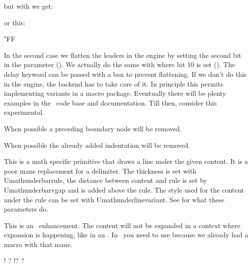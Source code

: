 but with  we get:

\startlinecorrection
\normalizeparmode\zerocount
\getbuffer[b]
\stoplinecorrection

or this:

\startlinecorrection
\normalizeparmode"FF
\getbuffer[b]
\stoplinecorrection

In the second case we flatten the leaders in the engine by setting the second bit
in the  parameter (). We actually do the same
with  where bit 10 is set (). The \type
{delay} keyword can be passed with a box to prevent flattening. If we don't do
this in the engine, the backend has to take care of it. In principle this permits
implementing variants in a macro package. Eventually there will be plenty examples in
the \CONTEXT\ code base and documentation. Till then, consider this experimental.

\stopnewprimitive

\startoldprimitive[title={\prm {unboundary}}]

When possible a preceding boundary node will be removed.

\stopoldprimitive

\startnewprimitive[title={\prm {undent}}]

When possible the already added indentation will be removed.

\stopnewprimitive

\startoldprimitive[title={\prm {underline}}]

This is a math specific primitive that draws a line under the given content. It
is a poor mans replacement for a delimiter. The thickness is set with \prm
{Umathunderbarrule}, the distance between content and rule is set by \prm
{Umathunderbarvgap} and  is added above the rule. The
style used for the content under the rule can be set with \prm
{Umathunderlinevariant}. See  for what these parameters do.

\stopoldprimitive

\startoldprimitive[title={\prm {unexpanded}}]

This is an \ETEX\ enhancement. The content will not be expanded in a context
where expansion is happening, like in an . In \CONTEXT\ you need to
use  because we already had a macro with that name.

\startbuffer
\def \A{!}                       \meaning\A
\def \B{?}                       \meaning\B
\edef\C{\A\B}                    \meaning\C
\edef\C{\normalunexpanded{\A}\B} \meaning\C
\stopbuffer

